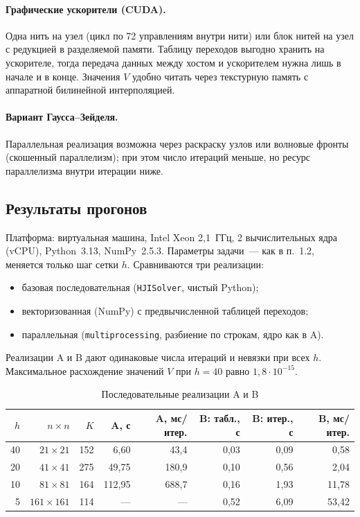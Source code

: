\documentclass[14pt,a4paper]{extarticle}
\begin{document}
\paragraph{Графические ускорители (CUDA).}
Одна нить на узел (цикл по 72 управлениям внутри нити) или блок нитей
на узел с редукцией в разделяемой памяти. Таблицу переходов выгодно
хранить на ускорителе, тогда передача данных между хостом и ускорителем
нужна лишь в начале и в конце. Значения $V$ удобно читать через
текстурную память с аппаратной билинейной интерполяцией.

\paragraph{Вариант Гаусса--Зейделя.}
Параллельная реализация возможна через раскраску узлов или
волновые фронты (скошенный параллелизм); при этом число итераций
меньше, но ресурс параллелизма внутри итерации ниже.

\subsection{Результаты прогонов}

Платформа: виртуальная машина, Intel Xeon 2{,}1~ГГц, 2 вычислительных
ядра (vCPU), Python~3.13, NumPy~2.5.3. Параметры задачи~--- как в п.~1.2,
меняется только шаг сетки $h$. Сравниваются три реализации:
\begin{itemize}
	\item[A.] базовая последовательная (\texttt{HJISolver}, чистый Python);
	\item[B.] векторизованная (NumPy) с предвычисленной таблицей переходов;
	\item[C.] параллельная (\texttt{multiprocessing}, разбиение по строкам,
	ядро как в A).
\end{itemize}
Реализации A и B дают одинаковые числа итераций и невязки при всех $h$.
Максимальное расхождение значений $V$ при $h=40$ равно $1{,}8\cdot10^{-15}$.

\begin{table}[H]
	\centering
	\caption{Последовательные реализации A и B}
	\label{tab:seq}
	\small
	\begin{tabular}{@{}rrrrrrrr@{}}
		\toprule
		$h$ & $n\times n$ & $K$ & A, с & A, мс/итер. & B: табл., с & B: итер., с & B, мс/итер. \\
		\midrule
		40 & $21\times21$ & 152 & 6{,}60  & 43{,}4  & 0{,}03 & 0{,}09 & 0{,}58 \\
		20 & $41\times41$ & 275 & 49{,}75 & 180{,}9 & 0{,}10 & 0{,}56 & 2{,}04 \\
		10 & $81\times81$ & 164 & 112{,}95 & 688{,}7 & 0{,}16 & 1{,}93 & 11{,}78 \\
		5  & $161\times161$ & 114 & --- & --- & 0{,}52 & 6{,}09 & 53{,}42 \\
		\bottomrule
	\end{tabular}
\end{table}
\end{document}
